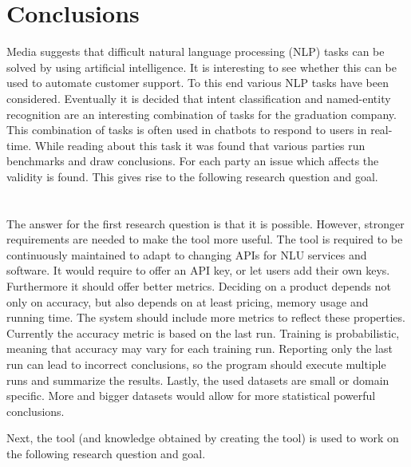 \chapter{Conclusions}
\label{ch:conclusions}
Media suggests that difficult natural language processing (NLP) tasks can be solved by using artificial intelligence.
It is interesting to see whether this can be used to automate customer support.
To this end various NLP tasks have been considered.
Eventually it is decided that intent classification and named-entity recognition are an interesting combination of tasks for the graduation company.
This combination of tasks is often used in chatbots to respond to users in real-time.
While reading about this task it was found that various parties run benchmarks and draw conclusions.
For each party an issue which affects the validity is found.
This gives rise to the following research question and goal.\\

\rqone\\

\rgone\\

The answer for the first research question is that it is possible.
However, stronger requirements are needed to make the tool more useful.
The tool is required to be continuously maintained to adapt to changing APIs for NLU services and software.
It would require to offer an API key, or let users add their own keys.
Furthermore it should offer better metrics.
Deciding on a product depends not only on accuracy, but also depends on at least pricing, memory usage and running time.
The system should include more metrics to reflect these properties.
Currently the accuracy metric is based on the last run.
Training is probabilistic, meaning that accuracy may vary for each training run.
Reporting only the last run can lead to incorrect conclusions, so the program should execute multiple runs and summarize the results.
Lastly, the used datasets are small or domain specific.
More and bigger datasets would allow for more statistical powerful conclusions.

Next, the tool (and knowledge obtained by creating the tool) is used to work on the following research question and goal.\\

\rqtwo\\

\rgtwo\\

